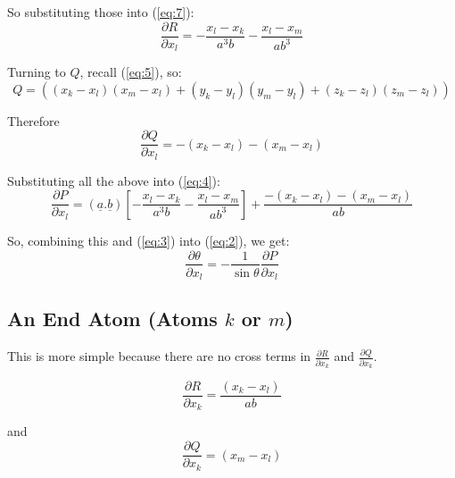 \documentclass[a4paper,twocolumn,9pt]{article}
\begin{document}
So substituting those into (\ref{eq:7}):
\begin{displaymath}
  \frac{\partial R}{\partial x_l} = -\frac{x_l-x_k}{a^3b} -\frac{x_l-x_m}{ab^3}
\end{displaymath}

Turning to $Q$, recall (\ref{eq:5}), so: 
\begin{displaymath}
  Q =  
  ((x_k-x_l)(x_m-x_l) + (y_k-y_l)(y_m-y_l) + (z_k-z_l)(z_m-z_l))
\end{displaymath}

Therefore
\begin{displaymath}
   \frac{\partial Q}{\partial x_l} = -(x_k-x_l) -(x_m-x_l)
\end{displaymath}

Substituting all the above into (\ref{eq:4}):
\begin{displaymath}
  \frac{\partial P}{\partial x_l} = ({\underline a}.{\underline b})[-\frac{x_l-x_k}{a^3b} -\frac{x_l-x_m}{ab^3}] + \frac{-(x_k-x_l)-(x_m-x_l)}{ab}
\end{displaymath}

So, combining this and (\ref{eq:3}) into (\ref{eq:2}), we get: 
\begin{displaymath}
  \frac{\partial \theta}{\partial x_l} = -\frac{1}{\sin \theta}  \frac{\partial P}{\partial x_l} 
\end{displaymath}







\subsection{An End Atom (Atoms $k$ or $m$)}
This is more simple because there are no cross terms in 
$\frac{\partial R}{\partial x_k}$ and $\frac{\partial Q}{\partial x_k}$.

\begin{displaymath}
  \frac{\partial R}{\partial x_k} = \frac{(x_k-x_l)}{ab}
\end{displaymath}

and 
\begin{displaymath}
  \frac{\partial Q}{\partial x_k} = (x_m-x_l)
\end{displaymath}
\end{document}
